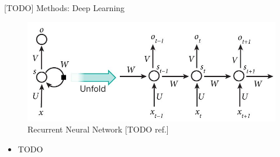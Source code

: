 \documentclass[final,hyperref={pdfpagelabels=false}]{beamer}
\begin{document}
\begin{frame}[t]
\begin{columns}[t]
\begin{column}{.465\textwidth}
\begin{block}{[TODO] Methods: Deep Learning}
\begin{figure}
\includegraphics[width=.6\linewidth]{nature-deep-learning/fig_5}
\caption{Recurrent Neural Network [TODO ref.]}
\end{figure}
\begin{itemize}
\item TODO
\end{itemize}

\end{block}






\end{column}
\end{columns}
\end{frame}
\end{document}
